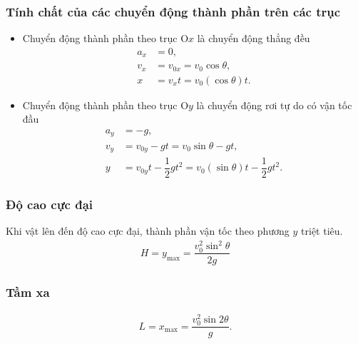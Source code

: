 \subsubsection{Tính chất của các chuyển động thành phần trên các trục}
\begin{itemize}
	\item Chuyển động thành phần theo trục O$x$ là chuyển động thẳng đều 
	\begin{align*}
		a_x&=0,\\
		v_x&=v_{0x}=v_0\cos\theta,\\
		x&=v_xt=v_0\left(\cos\theta\right) t.
	\end{align*}
	\item Chuyển động thành phần theo trục O$y$ là chuyển động rơi tự do có vận tốc đầu
	\begin{align}
		a_y&=-g,\\
		v_y&=v_{0y}-gt=v_0\sin\theta-gt,\\
		y&=v_{0y}t-\dfrac{1}{2}gt^{2}=v_0\left(\sin\theta\right) t-\dfrac{1}{2}gt^{2}.
	\end{align}
\end{itemize} 
\subsubsection{Độ cao cực đại}
Khi vật lên đến độ cao cực đại, thành phần vận tốc theo phương $y$ triệt tiêu. 
\begin{align*}
	H=y_{\max}=\dfrac{v_0^2\sin^2\theta}{2g}
\end{align*}

\subsubsection{Tầm xa}
\vspace{-0.5cm}
\begin{align*}
	L = x_{\max} = \dfrac{v_0^2 \sin 2\theta}{g}.
\end{align*}
